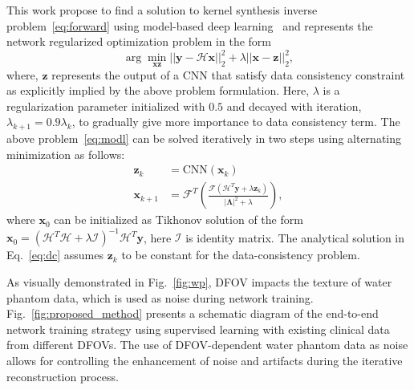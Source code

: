 \documentclass{article}
\def\x{{\bm{x}}}
\def\y{{\bm{y}}}
\def\z{{\bm z}}
\def\H{{ \bm{\mathcal H}}}
\def\F{{\bm{\mathcal F}}}
\begin{document}
This work propose to find a solution to kernel synthesis inverse problem~\eqref{eq:forward} using model-based deep learning~\cite{modl} and represents the network regularized optimization problem in the form
\begin{equation}
	\label{eq:modl}
	\arg\min_{\x \z} ||\y - \H \x ||_2^2 + \lambda ||\x -\z||^2_2,
\end{equation}
where, $\z$ represents the output of a CNN that satisfy data consistency constraint as explicitly implied by the above problem formulation. Here, $\lambda $ is a regularization parameter initialized with $0.5$ and decayed with iteration, $\lambda_{k+1} =0.9\lambda_k$, to gradually give more importance to data consistency term. The above problem~\eqref{eq:modl} can be solved iteratively in two steps using alternating minimization as follows:
\begin{align}	
	\z_k&= \text{CNN}(\x_k) \label{eq:cnn}\\
	\x_{k+1}&= \F^T \left( \frac{\F(\H^T \y + \lambda \z_k)	}{|\bm{\Lambda} |^2 + \lambda} \right ) \label{eq:dc}, 	
\end{align}
where $\x_0$ can be initialized as Tikhonov solution of the form $\x_0=(\H^T \H +\lambda \bm{\mathcal I} )^{-1} \H^T \y$, here $\bm{\mathcal I}$ is identity matrix. The analytical solution in Eq.~\eqref{eq:dc}  assumes $\z_k$ to be constant for the data-consistency problem.


\begin{comment}
\begin{figure}
	\centering
	\texttt{[image: paper\_fig\_wire\_images.pdf]}
	\caption{Estimated wire phantom images visually show that proposed method results in sharper output compared to a direct learning method. }
	\label{fig:wire}
\end{figure}


\begin{figure}	
	\centering
	\texttt{[image: paper\_fig\_estimtedMTF.pdf]}		
	\caption{ Quantitative results at DFOV 10 cm on wire phantom data demonstrate that the proposed method produces sharper output compared to the direct learning method. The orange curve represents the direct learning method, which has less mid-frequency boost compared to the green curve representing the proposed method. }
	\label{fig:estimatedMTF}
\end{figure}
\end{comment}


As visually demonstrated in Fig.~\ref{fig:wp}, DFOV impacts the texture of water phantom data, which is used as noise during network training. Fig.~\ref{fig:proposed_method} presents a schematic diagram of the end-to-end network training strategy using supervised learning with existing clinical data from different DFOVs. The use of DFOV-dependent water phantom data as noise allows for controlling the enhancement of noise and artifacts during the iterative reconstruction process.
\end{document}

